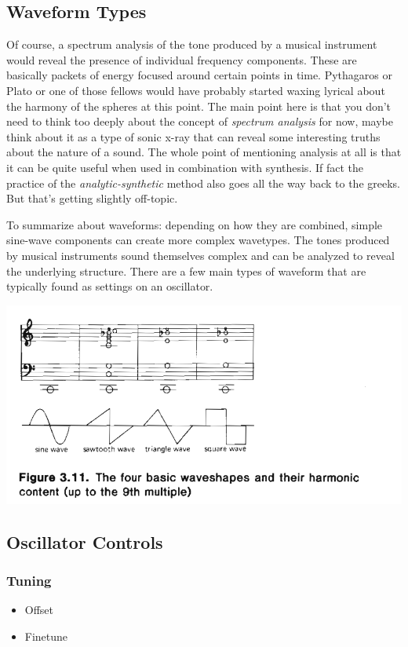 \documentclass[11pt]{article}
\begin{document}
\subsection{Waveform Types}
\label{sec:orgd814e18}
Of course, a spectrum analysis of the tone produced by a musical
instrument would reveal the presence of individual frequency
components. These are basically packets of energy focused around
certain points in time. Pythagaros or Plato or one of those fellows
would have probably started waxing lyrical about the harmony of the
spheres at this point. 
The main point here is that you don't need to think too deeply about
the concept of \emph{spectrum analysis} for now, maybe think about it as a
type of sonic x-ray that can reveal some interesting truths about the
nature of a sound. 
The whole point of mentioning analysis at all is that it can be quite
useful when used in combination with synthesis. If fact the practice
of the \emph{analytic-synthetic} method also goes all the way back to the
greeks. But that's getting slightly off-topic.   

To summarize about waveforms: depending on how they are combined,
simple sine-wave components can create more complex wavetypes. The
tones produced by musical instruments sound themselves complex and can
be analyzed to reveal the underlying structure. There are a few main
types of waveform that are typically found as settings on an oscillator.

\begin{center}
\includegraphics[width=.9\linewidth]{./images/waveforms.png}
\end{center}

\subsection{Oscillator Controls}
\label{sec:org2d4b8ca}
\subsubsection{Tuning}
\label{sec:orgd8ad21d}
\begin{itemize}
\item Offset
\item Finetune
\end{itemize}
\end{document}
